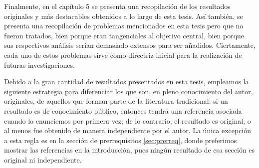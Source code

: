 Finalmente, en el capítulo 5 se presenta una recopilación de los resultados originales y más
destacables obtenidos a lo largo de esta tesis. Así también, se presenta una recopilación de
problemas mencionados en esta tesis pero que no fueron tratados, bien porque eran tangenciales al
objetivo central, bien porque sus respectivos análisis serían demasiado extensos para ser añadidos.
Ciertamente, cada uno de estos problemas sirve como directriz inicial para la realización de futuras
investigaciones.

Debido a la gran cantidad de resultados presentados en esta tesis, empleamos la siguiente estrategia
para diferenciar los que son, en pleno conocimiento del autor, originales, de aquellos que forman
parte de la literatura tradicional: si un resultado es de conocimiento público, entonces tendrá una
referencia asociada cuando lo enunciemos por primera vez; de lo contrario, el resultado es original,
o al menos fue obtenido de manera independiente por el autor. La única excepción a esta regla es en
la sección de prerrequisitos \ref{sec:prerreq}, donde preferimos mostrar las referencias en la
introducción, pues ningún resultado de esa sección es original ni independiente.
